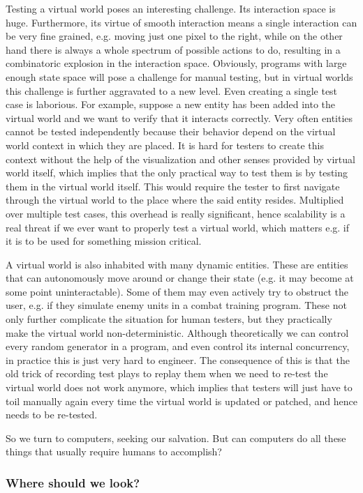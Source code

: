 \documentclass[sigplan]{acmart}\settopmatter{printfolios=false,printccs=false,printacmref=false}
\begin{document}
Testing a virtual world poses an interesting challenge. Its interaction space is huge. Furthermore,
its virtue of smooth interaction means a single interaction can be very fine grained, e.g. moving
just one pixel to the right, while on the other hand there is always a whole spectrum of possible
actions to do, resulting in a combinatoric explosion in the interaction space. Obviously, programs 
with large enough state space will pose a challenge for manual testing, but in virtual worlds 
this challenge is further aggravated to a new level. Even creating a single test case
is laborious. For example, suppose a new entity has been added into the virtual world and we 
want to verify that it interacts correctly. Very often entities cannot be tested independently
because their behavior depend on the virtual world context in which they are placed. It is hard
for testers to create this context without the help of the visualization and other senses provided
by virtual world itself, which implies that the only practical way to test them is by testing them in
the virtual world itself. This would require the tester to first navigate through the virtual 
world to the place where the said entity resides. Multiplied over multiple test cases, this overhead
is really significant, hence scalability is a real threat if we ever want to properly
test a virtual world, which matters e.g. if it is to be used for something mission critical.


A virtual world is
also inhabited with many dynamic entities. These are entities that can autonomously move around
or change their state (e.g. it may become at some point uninteractable). Some of them may even
actively try to obstruct the user, e.g. if they simulate enemy units in a combat training 
program. These not only further complicate the situation for human testers, but they practically
make the virtual world non-deterministic. Although theoretically we can control every random
generator in a program, and even control its internal concurrency, in practice this is
just very hard to engineer. The consequence of this is that the old trick of recording
test plays to replay them when we need to re-test the virtual world does not work anymore,
which implies that testers will just have to toil manually again every time the virtual
world is updated or patched, and hence needs to be re-tested.

So we turn to computers, seeking our salvation. But can computers do all these things that usually
require humans to accomplish?

\subsubsection*{Where should we look?}
\end{document}
